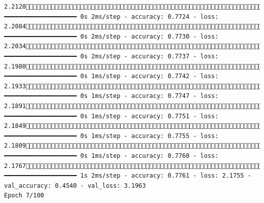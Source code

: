 \documentclass[
  letterpaper,
  DIV=11,
  numbers=noendperiod]{scrartcl}
\begin{document}
\begin{verbatim}
2.2128601/858 ━━━━━━━━━━━━━━━━━━━━ 0s 2ms/step - accuracy: 0.7724 - loss: 2.2084638/858 ━━━━━━━━━━━━━━━━━━━━ 0s 2ms/step - accuracy: 0.7730 - loss: 2.2034677/858 ━━━━━━━━━━━━━━━━━━━━ 0s 2ms/step - accuracy: 0.7737 - loss: 2.1980713/858 ━━━━━━━━━━━━━━━━━━━━ 0s 1ms/step - accuracy: 0.7742 - loss: 2.1933747/858 ━━━━━━━━━━━━━━━━━━━━ 0s 1ms/step - accuracy: 0.7747 - loss: 2.1891781/858 ━━━━━━━━━━━━━━━━━━━━ 0s 1ms/step - accuracy: 0.7751 - loss: 2.1849814/858 ━━━━━━━━━━━━━━━━━━━━ 0s 1ms/step - accuracy: 0.7755 - loss: 2.1809849/858 ━━━━━━━━━━━━━━━━━━━━ 0s 1ms/step - accuracy: 0.7760 - loss: 2.1767858/858 ━━━━━━━━━━━━━━━━━━━━ 1s 2ms/step - accuracy: 0.7761 - loss: 2.1755 - val_accuracy: 0.4540 - val_loss: 3.1963
Epoch 7/100

\end{verbatim}
\end{document}
